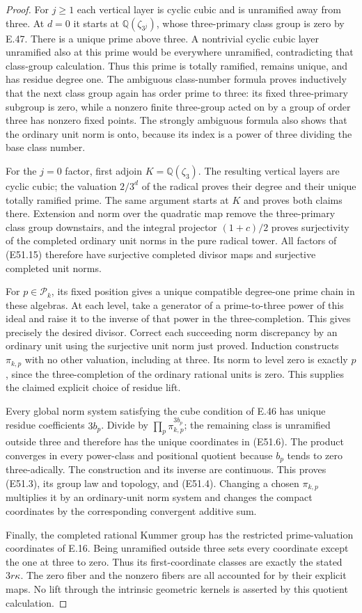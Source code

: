 \begin{proof}
For $j\ge1$ each vertical layer is cyclic
cubic and is unramified away from three.
At $d=0$ it starts at $\mathbb Q(\zeta_{3^j})$,
whose three-primary class group is zero
by E.47. There is a unique prime above three.
A nontrivial cyclic cubic layer unramified
also at this prime would be everywhere
unramified, contradicting that class-group
calculation. Thus this prime is totally
ramified, remains unique, and has residue
degree one. The ambiguous class-number
formula proves inductively that the next
class group again has order prime to three:
its fixed three-primary subgroup is zero,
while a nonzero finite three-group acted on
by a group of order three has nonzero fixed
points. The strongly ambiguous formula
\cite[Theorem1, formula(2)]{E_LemmermeyerAmbiguous}
also shows that the ordinary unit norm is
onto, because its index is a power of three
dividing the base class number.

For the $j=0$ factor, first adjoin
$K=\mathbb Q(\zeta_3)$. The resulting vertical
layers are cyclic cubic; the valuation
$2/3^d$ of the radical proves their degree
and their unique totally ramified prime.
The same argument starts at $K$ and proves
both claims there. Extension and norm over
the quadratic map remove the three-primary
class group downstairs, and the integral
projector $(1+c)/2$ proves surjectivity of
the completed ordinary unit norms in the
pure radical tower. All factors of (E51.15)
therefore have surjective completed divisor
maps and surjective completed unit norms.

For $p\in\mathscr P_k$, its fixed position
gives a unique compatible degree-one prime
chain in these algebras. At each level,
take a generator of a prime-to-three power
of this ideal and raise it to the inverse
of that power in the three-completion.
This gives precisely the desired divisor.
Correct each succeeding norm discrepancy
by an ordinary unit using the surjective
unit norm just proved. Induction constructs
$\pi_{k,p}$ with no other valuation,
including at three. Its norm to level zero
is exactly $p$, since the three-completion
of the ordinary rational units is zero.
This supplies the claimed explicit choice
of residue lift.

Every global norm system satisfying the
cube condition of E.46 has unique residue
coefficients $3b_p$. Divide by
$\prod_p\pi_{k,p}^{3b_p}$; the remaining
class is unramified outside three and
therefore has the unique coordinates in
(E51.6). The product converges in every
power-class and positional quotient
because $b_p$ tends to zero three-adically.
The construction and its inverse are
continuous. This proves (E51.3), its group
law and topology, and (E51.4). Changing a
chosen $\pi_{k,p}$ multiplies it by an
ordinary-unit norm system and changes
the compact coordinates by the
corresponding convergent additive sum.

Finally, the completed rational Kummer
group has the restricted prime-valuation
coordinates of E.16. Being unramified
outside three sets every coordinate
except the one at three to zero. Thus
its first-coordinate classes are exactly
the stated $3r\kappa$. The zero fiber
and the nonzero fibers are all accounted
for by their explicit maps. No lift
through the intrinsic geometric kernels
is asserted by this quotient calculation.
\end{proof}
